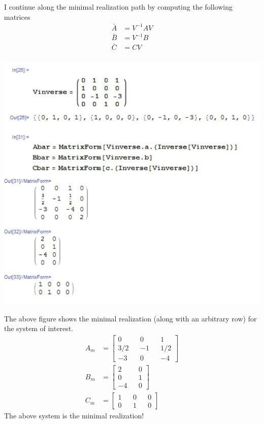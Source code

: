 \documentclass[paper=a4,margin, fontsize=11pt]{scrartcl} %
\numberwithin{equation}{section} %
\numberwithin{figure}{section} %
\numberwithin{table}{section} %
\begin{document}
I continue along the minimal realization path by computing the following matrices
\begin{align*}
\bar{A}&=V^{-1}AV\\
\bar{B}&=V^{-1}B\\
\bar{C}&=CV\\
\end{align*}
\begin{center}
{\includegraphics{6g2}}
\end{center}
The above figure shows the minimal realization (along with an arbitrary row) for the system of interest. 
\begin{align*}
A_m&=\begin{bmatrix}0 && 0 && 1\\ 3/2 && -1 && 1/2\\-3 && 0 && -4\end{bmatrix}\\
B_m&=\begin{bmatrix}2 && 0\\0 && 1\\-4 && 0\end{bmatrix}\\
C_m&=\begin{bmatrix}1 && 0 && 0\\0 && 1 && 0\end{bmatrix}
\end{align*}
The above system is the minimal realization!\\
\end{document}
